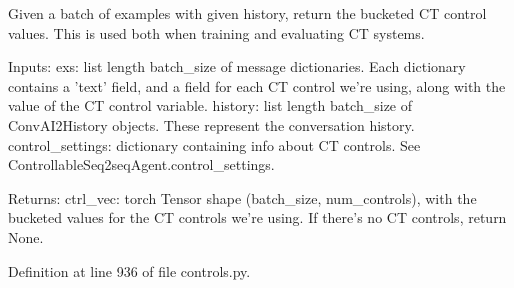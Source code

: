 \begin{DoxyVerb}Given a batch of examples with given history, return the bucketed CT control values.
This is used both when training and evaluating CT systems.

Inputs:
  exs: list length batch_size of message dictionaries. Each dictionary contains
    a 'text' field, and a field for each CT control we're using, along with the
    value of the CT control variable.
  history: list length batch_size of ConvAI2History objects. These represent the
    conversation history.
  control_settings: dictionary containing info about CT controls.
    See ControllableSeq2seqAgent.control_settings.

Returns:
  ctrl_vec: torch Tensor shape (batch_size, num_controls), with the bucketed values
    for the CT controls we're using. If there's no CT controls, return None.
\end{DoxyVerb}
 

Definition at line 936 of file controls.\+py.


